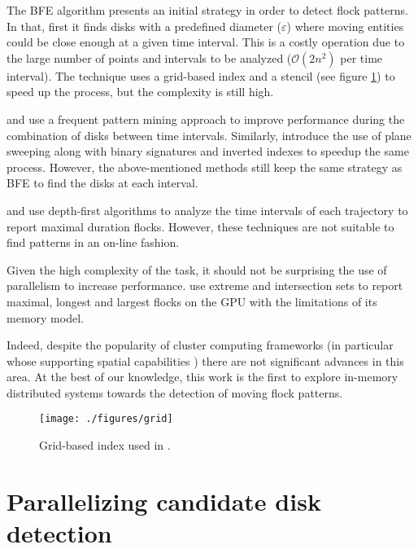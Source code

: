 \documentclass[12pt]{scrartcl}
\begin{document}
The BFE algorithm presents an initial strategy in order to detect flock patterns.  In that, first it finds disks with a predefined diameter ($\varepsilon$) where moving entities could be close enough at a given time interval.  This is a costly operation due to the large number of points and intervals to be analyzed ($\mathcal{O}(2n^2)$ per time interval).  The technique uses a grid-based index and a stencil (see figure \ref{fig:grid}) to speed up the process, but the complexity is still high.

\cite{calderon_romero_mining_2011} and \cite{turdukulov_visual_2014} use a frequent pattern mining approach to improve performance during the combination of disks between time intervals.  Similarly, \cite{tanaka_improved_2016} introduce the use of plane sweeping along with binary signatures and inverted indexes to speedup the same process.  However, the above-mentioned methods still keep the same strategy as BFE to find the disks at each interval.  

\cite{arimura_finding_2014} and \cite{geng_enumeration_2014} use depth-first algorithms to analyze the time intervals of each trajectory to report maximal duration flocks.  However, these techniques are not suitable to find patterns in an on-line fashion.

Given the high complexity of the task, it should not be surprising the use of parallelism to increase performance.  \cite{fort_parallel_2014} use extreme and intersection sets to report maximal, longest and largest flocks on the GPU with the limitations of its memory model.  

Indeed, despite the popularity of cluster computing frameworks (in particular whose supporting spatial capabilities \citep{eldawy_spatialhadoop:_2014, yu_demonstration_2016, pellechia_geomesa:_2015-1, xie_simba:_2016-1}) there are not significant advances in this area.  At the best of our knowledge, this work is the first to explore in-memory distributed systems towards the detection of moving flock patterns.

\begin{figure}
 \centering
 \texttt{[image: ./figures/grid]}
 \caption{Grid-based index used in \cite{vieira_-line_2009}.}
 \label{fig:grid}
\end{figure}

\section{Parallelizing candidate disk detection}\label{sec:candidates}
\end{document}
